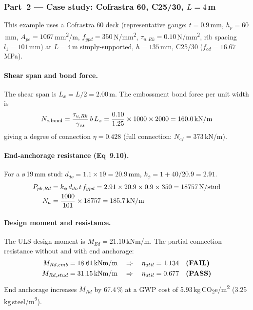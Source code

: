 \subsubsection*{Part~2 --- Case study: Cofrastra 60, C25/30, $L = 4$\,m}

This example uses a Cofrastra 60 deck (representative gauge: $t = 0.9$\,mm, $h_p = 60$\,mm, $A_{pe} = 1067$\,mm\textsuperscript{2}/m, $f_{ypd} = 350$\,N/mm\textsuperscript{2}, $\tau_{u,Rk} = 0.10$\,N/mm\textsuperscript{2}, rib spacing $l_1 = 101$\,mm) at $L = 4$\,m simply-supported, $h = 135$\,mm, C25/30 ($f_{cd} = 16.67$\,MPa).

\paragraph{Shear span and bond force.}
The shear span is $L_x = L/2 = 2.00$\,m. The embossment bond force per unit width is
\begin{equation}
    N_{c,\mathrm{bond}} = \frac{\tau_{u,Rk}}{\gamma_{vs}}\,b\,L_x
    = \frac{0.10}{1.25}\times 1000\times2000
    = 160.0\text{\,kN/m}
\end{equation}
giving a degree of connection $\eta = 0.428$ (full connection: $N_{cf} = 373$\,kN/m).

\paragraph{End-anchorage resistance (Eq~9.10).}
For a \o\,19\,mm stud: $d_{do} = 1.1\times19 = 20.9$\,mm, $k_\phi = 1 + 40/20.9 = 2.91$.
\begin{align}
    P_{pb,Rd} &= k_\phi\,d_{do}\,t\,f_{ypd} = 2.91\times20.9\times0.9\times350 = 18757\text{\,N/stud} \\
    N_a &= \frac{1000}{101}\times18757 = 185.7\text{\,kN/m}
\end{align}

\paragraph{Design moment and resistance.}
The ULS design moment is $M_{Ed} = 21.10$\,kNm/m. The partial-connection resistance without and with end anchorage:
\begin{align}
    M_{Rd,emb}  &= 18.61\text{\,kNm/m}\quad\Rightarrow\quad \eta_{util} = 1.134\quad \textbf{(FAIL)} \\
    M_{Rd,stud} &= 31.15\text{\,kNm/m}\quad\Rightarrow\quad \eta_{util} = 0.677\quad \textbf{(PASS)} 
\end{align}
End anchorage increases $M_{Rd}$ by 67.4\,\% at a GWP cost of 5.93\,kg\,CO\textsubscript{2}e/m\textsuperscript{2} (3.25\,kg\,steel/m\textsuperscript{2}).


